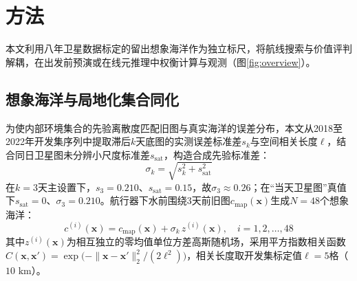 \section{方法}

本文利用八年卫星数据标定的留出想象海洋作为独立标尺，将航线搜索与价值评判解耦，在出发前预演或在线元推理中权衡计算与观测（图\ref{fig:overview}）。


\subsection{想象海洋与局地化集合同化}

为使内部环境集合的先验离散度匹配旧图与真实海洋的误差分布，本文从2018至2022年开发集序列中提取滞后$k$天底图的实测误差标准差$s_k$与空间相关长度$\ell$，结合同日卫星图未分辨小尺度标准差$s_{\text{sat}}$，构造合成先验标准差：
\begin{equation}
  \sigma_k = \sqrt{s_k^2 + s_{\text{sat}}^2}
  \label{eq:sigma_k}
\end{equation}
在$k=3$天主设置下，$s_3 = 0.210$、$s_{\text{sat}} = 0.15$，故$\sigma_3 \approx 0.26$；在“当天卫星图”真值下$s_{\text{sat}} = 0$、$\sigma_3 = 0.210$。航行器下水前围绕3天前旧图$c_{\text{map}}(\mathbf{x})$生成$N=48$个想象海洋：
\begin{equation}
  c^{(i)}(\mathbf{x}) = c_{\text{map}}(\mathbf{x}) + \sigma_k\, z^{(i)}(\mathbf{x}), \quad i = 1, 2, \dots, 48
  \label{eq:prior_ensemble}
\end{equation}
其中$z^{(i)}(\mathbf{x})$为相互独立的零均值单位方差高斯随机场，采用平方指数相关函数$C(\mathbf{x}, \mathbf{x}') = \exp\!\big(-\|\mathbf{x}-\mathbf{x}'\|_2^2 / (2\ell^2)\big)$，相关长度取开发集标定值$\ell = 5$格（$10\text{ km}$）。

